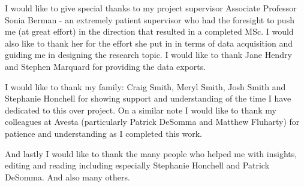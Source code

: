 I would like to give special thanks to my project supervisor Associate Professor Sonia Berman - an extremely patient supervisor who had the foresight to push me (at great effort) in the direction that resulted in a completed MSc. I would also like to thank her for the effort she put in in terms of data acquisition and guiding me in designing the research topic. I would like to thank Jane Hendry and Stephen Marquard for providing the data exports.

I would like to thank my family: Craig Smith, Meryl Smith, Josh Smith and Stephanie Honchell for showing support and understanding of the time I have dedicated to this over project. On a similar note I would like to thank my colleagues at Avesta (particularly Patrick DeSomma and Matthew Fluharty) for patience and understanding as I completed this work.

And lastly I would like to thank the many people who helped me with insights, editing and reading including especially Stephanie Honchell and Patrick DeSomma. And also many others.
